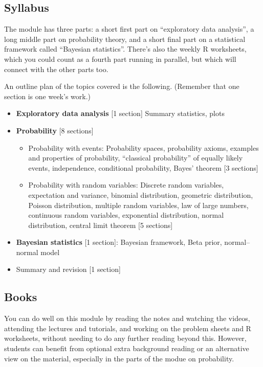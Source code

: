 \documentclass[
  a4paper,
]{book}
\providecommand{\tightlist}{%
  \setlength{\itemsep}{0pt}\setlength{\parskip}{0pt}}
\theoremstyle{definition}
\theoremstyle{definition}
\theoremstyle{definition}
\theoremstyle{remark}
\begin{document}
\hypertarget{syllabus}{%
\subsection*{Syllabus}\label{syllabus}}

The module has three parts: a short first part on ``exploratory data analysis'', a long middle part on probability theory, and a short final part on a statistical framework called ``Bayesian statistics''. There's also the weekly R worksheets, which you could count as a fourth part running in parallel, but which will connect with the other parts too.

An outline plan of the topics covered is the following. (Remember that one section is one week's work.)

\begin{itemize}
\tightlist
\item
  \textbf{Exploratory data analysis} {[}1 section{]} Summary statistics, plots
\item
  \textbf{Probability} {[}8 sections{]}

  \begin{itemize}
  \tightlist
  \item
    Probability with events: Probability spaces, probability axioms, examples and properties of probability, ``classical probability'' of equally likely events, independence, conditional probability, Bayes' theorem {[}3 sections{]}
  \item
    Probability with random variables: Discrete random variables, expectation and variance, binomial distribution, geometric distribution, Poisson distribution, multiple random variables, law of large numbers, continuous random variables, exponential distribution, normal distribution, central limit theorem {[}5 sections{]}
  \end{itemize}
\item
  \textbf{Bayesian statistics} {[}1 section{]}: Bayesian framework, Beta prior, normal--normal model
\item
  Summary and revision {[}1 section{]}
\end{itemize}

\hypertarget{books}{%
\subsection*{Books}\label{books}}

You can do well on this module by reading the notes and watching the videos, attending the lectures and tutorials, and working on the problem sheets and R worksheets, without needing to do any further reading beyond this. However, students can benefit from optional extra background reading or an alternative view on the material, especially in the parts of the modue on probability.
\end{document}
